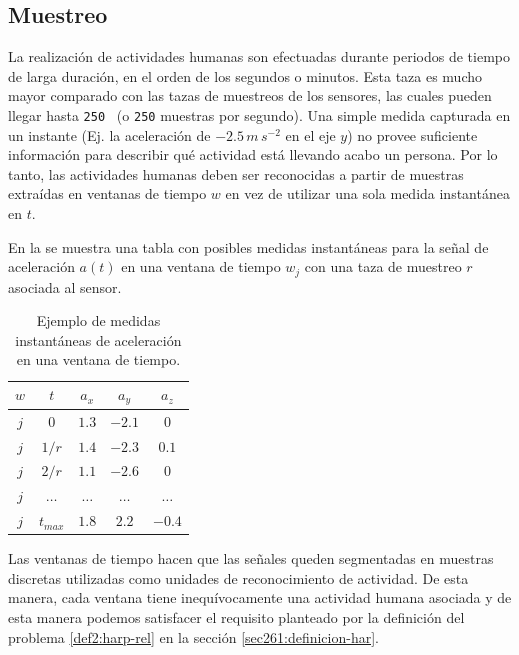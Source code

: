 \subsection{Muestreo}

\label{ssec44:sampling}La realización de actividades humanas son
efectuadas durante periodos de tiempo de larga duración, en el orden
de los segundos o minutos. Esta taza es mucho mayor comparado con
las tazas de muestreos de los sensores, las cuales pueden llegar hasta
\texttt{250 } (o \texttt{250} muestras por segundo). Una
simple medida capturada en un instante (Ej. la aceleración de $-2.5\,m\,s^{-2}$
en el eje $y$) no provee suficiente información para describir qué
actividad está llevando acabo un persona. Por lo tanto, las actividades
humanas deben ser reconocidas a partir de muestras extraídas en ventanas
de tiempo $w$ en vez de utilizar una sola medida instantánea en $t$. 

En la  se muestra una tabla con posibles medidas
instantáneas para la señal de aceleración $a(t)$ en una ventana de
tiempo $w_{j}$ con una taza de muestreo $r$asociada al sensor.

\begin{table}[!tbph]
\begin{centering}
\begin{tabular}{|c|c|c|c|c|}
\hline 
$w$ & $t$ & $a_{x}$ & $a_{y}$ & $a_{z}$\tabularnewline
\hline 
\hline 
$j$ & $0$ & \texttt{$1.3$} & \texttt{$-2.1$} & \texttt{$0$}\tabularnewline
\hline 
$j$ & $1/r$ & \texttt{$1.4$} & \texttt{$-2.3$} & \texttt{$0.1$}\tabularnewline
\hline 
$j$ & $2/r$ & \texttt{$1.1$} & \texttt{$-2.6$} & \texttt{$0$}\tabularnewline
\hline 
$j$ & $\ldots$ & \texttt{$\ldots$} & \texttt{$\ldots$} & \texttt{$\ldots$}\tabularnewline
\hline 
$j$ & $t_{max}$ & \texttt{$1.8$} & \texttt{$2.2$} & \texttt{$-0.4$}\tabularnewline
\hline 
\end{tabular}
\par\end{centering}
\caption[Medidas instantáneas de aceleración ]{\label{tab4:ex-signal}Ejemplo de medidas instantáneas de aceleración
en una ventana de tiempo.}
\end{table}

Las ventanas de tiempo hacen que las señales queden segmentadas en
muestras discretas utilizadas como unidades de reconocimiento de actividad.
De esta manera, cada ventana tiene inequívocamente una actividad humana
asociada y de esta manera podemos satisfacer el requisito planteado
por la definición del problema \ref{def2:harp-rel} en la sección
\ref{sec261:definicion-har}. 

